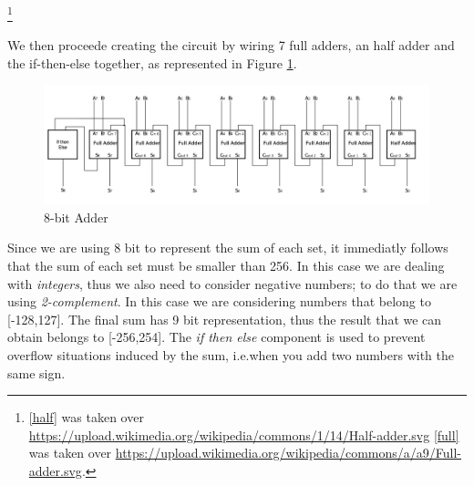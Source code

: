 \documentclass[12pt]{article}
\begin{document}
\footnote{\ref{half} was taken over \url{https://upload.wikimedia.org/wikipedia/commons/1/14/Half-adder.svg} 
\ref{full} was taken over \url{https://upload.wikimedia.org/wikipedia/commons/a/a9/Full-adder.svg}.}

We then proceede creating the circuit by wiring 7 full adders, an half adder and the if-then-else together, as represented in Figure \ref{circuit}.

\begin{figure}[!h]
    \centering
    \includegraphics[width=0.83\linewidth]{../src/images/Circuit.png}
    \caption{8-bit Adder}\label{circuit}
\end{figure}
Since we are using 8 bit to represent the sum of each set, it immediatly follows that the sum of each set must be smaller than 256. In this case we are dealing with \textit{integers}, thus we also need to consider negative numbers; to do that we are using \textit{2-complement}. In this case we are considering numbers that belong to [-128,127]. The final sum has 9 bit representation, thus the result that we can obtain belongs to [-256,254]. The \textit{if then else} component is used to prevent overflow situations induced by the sum, i.e.when you add two numbers with the same sign.
\end{document}
